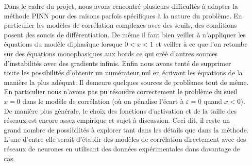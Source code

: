 Dans le cadre du projet, nous avons rencontré plusieurs difficultés à adapter la méthode PINN pour des raisons parfois spécifiques à la nature du problème. En particulier les modèles de corrélation complexes avec des seuils, des conditions posent des soucis de différentiation. De même il faut bien veiller à n'appliquer les équations du modèle diphasique lorsque $0<x<1$ et veiller à ce que l'on retombe sur des équations monophasiques aux bords ce qui créé d'autres sources d'instabilités avec des gradients infinis. Enfin nous avons tenté de supprimer toute les possibilités d'obtenir un numérateur nul en écrivant les équations de la manière la plus adéquat. Il demeure quelques sources de problèmes tout de même. En particulier nous n'avons pas pu résoudre correctement le problème du sueil $x=0$ dans le modèle de corrélation (où on pénalise l'écart à $\varepsilon = 0$ quand $x<0$).\\

De manière plus générale, le choix des fonctions d'activation et de la taille des réseaux est encore assez empirique et sujet à discussion. Ceci dit, il reste un grand nombre de possibilités à explorer tant dans les détails que dans la méthode. L'une d'entre elle serait d'établir des modèles de corrélation directement avec des réseaux de neurones en utilisant des données expérimentales dans davantage de cas.

